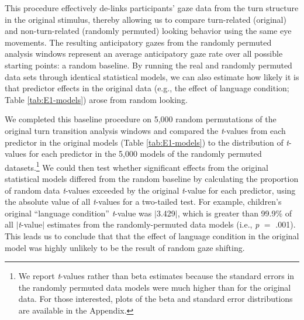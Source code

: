 \documentclass[authoryear, 12pt]{elsarticle}
\begin{document}
This procedure effectively de-links participants' gaze data from the turn structure in the original stimulus, thereby allowing us to compare turn-related (original) and non-turn-related (randomly permuted) looking behavior using the same eye movements. The resulting anticipatory gazes from the randomly permuted analysis windows represent an average anticipatory gaze rate over all possible starting points: a random baseline. By running the real and randomly permuted data sets through identical statistical models, we can also estimate how likely it is that predictor effects in the original data (e.g., the effect of language condition; Table \ref{tab:E1-models}) arose from random looking.

We completed this baseline procedure on 5,000 random permutations of the original turn transition analysis windows and compared the \textit{t}-values from each predictor in the original models (Table \ref{tab:E1-models}) to the distribution of \textit{t}-values for each predictor in the 5,000 models of the randomly permuted datasets.\footnote{We report \textit{t}-values rather than beta estimates because the standard errors in the randomly permuted data models were much higher than for the original data. For those interested, plots of the beta and standard error distributions are available in the Appendix.} We could then test whether significant effects from the original statistical models differed from the random baseline by calculating the proportion of random data \textit{t}-values exceeded by the original \textit{t}-value for each predictor, using the absolute value of all \textit{t}-values for a two-tailed test. For example, children's original ``language condition'' \textit{t}-value was $|$3.429$|$, which is greater than 99.9\% of all $|$\textit{t}-value$|$ estimates from the randomly-permuted data models (i.e., \textit{p} $=$ .001). This leads us to conclude that that the effect of language condition in the original model was highly unlikely to be the result of random gaze shifting. 
\end{document}
